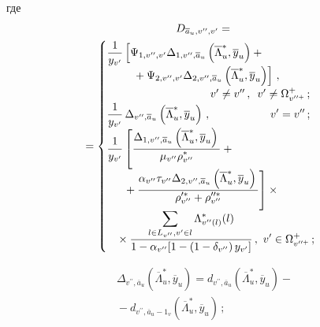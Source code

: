    \begin{multicols}{2}
   
   \noindent
   где 
   \begin{multline*}
   D_{\overline{a}_u, v^{\prime\prime}, v^\prime}={}\\
   {}=
   \begin{cases}
   \fr{1}{y_{v^\prime}}\left[ \Psi_{1, v^{\prime\prime}, v^\prime}
   \Delta_{1, v^{\prime\prime}, \overline{a}_u} \left(\overline{\Lambda}_u^*, 
\overline{y}_u\right)+{}\right.\\
   \hspace*{8mm}\left.{}+\Psi_{2, v^{\prime\prime}, v^\prime}
   \Delta_{2, v^{\prime\prime}, \overline{a}_u} \left(\overline{\Lambda}_u^*, 
\overline{y}_u\right)\right]\,, \\
 \hspace*{33mm}v^\prime\not= v^{\prime\prime}\,,\enskip 
v^\prime\not=\Omega^+_{v^{\prime\prime +}}\,;\\
   \fr{1}{y_{v^\prime}}\,\Delta_{v^{\prime\prime}, 
\overline{a}_u}\left(\overline{\Lambda}_u^*, \overline{y}_u\right)\,,\hspace*{19mm} 
v^\prime=v^{\prime\prime}\,;\\
   \fr{1}{y_{v^\prime}}\left[ 
   \fr{\Delta_{1,v^{\prime\prime}, 
\overline{a}_u}\left(\overline{\Lambda}_u^*,\overline{y}_u\right)}
   {\mu_{v^{\prime\prime}} \rho_{ v^{\prime\prime}}^*}+{}\right.\\
\left.   \hspace*{5mm}{}+
   \fr{\alpha_{ v^{\prime\prime}}\tau_{ v^{\prime\prime}}\Delta_{2, 
v^{\prime\prime}, \overline{a}_u}\left(\overline{\Lambda}_u^*, \overline{y}_u\right)}
   {\rho_{ v^{\prime\prime}}^{\prime *}+\rho_{ v^{\prime\prime}}^{\prime\prime *}}\right] \times{}\\
   {}\hspace*{3mm}\times
   \fr{\sum\limits_{l\in L_{ v^{\prime\prime}}, v^\prime\in l} 
\Lambda^*_{v^{\prime\prime}(l)}(l)}
   {1-\alpha_{ v^{\prime\prime}}[1-\left(1-\delta_{ 
v^{\prime\prime}}\right)y_{v^\prime}]}\,,\ v^\prime \in \Omega^+_{v^{\prime\prime 
+}}\,;
   \end{cases}
   \end{multline*}
   
   \vspace*{-12pt}
   
   \noindent
\begin{multline*}
   \Delta_{v^{\prime\prime},\overline{a}_u}\left(\overline{\Lambda}^*_u, 
\overline{y}_u\right) = d_{ v^{\prime\prime},\overline{a}_u} 
\left(\overline{\Lambda}_u^*, \overline{y}_u\right) -{}\\
{}-d_{ v^{\prime\prime},\overline{a}_u-
1_v}\left(\overline{\Lambda}_u^*, \overline{y}_u\right)\,;
\end{multline*}


\end{multicols}
